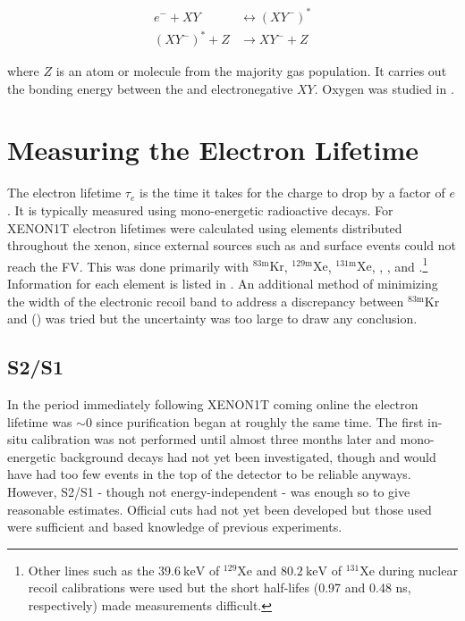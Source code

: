 \begin{enumerate}
\begin{subequations}
\begin{align}
e^- + XY &\leftrightarrow (XY^-)^* \\
(XY^-)^* + Z &\rightarrow XY^- + Z
\end{align}
\end{subequations}

\vspace{-5pt}

\noindent where $Z$ is an atom or molecule from the majority gas population.  It carries out the bonding energy between the
\electron and electronegative $XY$.  Oxygen was studied in .
\end{enumerate}



\section{Measuring the Electron Lifetime}
\label{sec:electron_lifetime_measurements}
The electron lifetime $\tau_e$ is the time it takes for the charge to drop by a factor of $e$.  It is typically measured using mono-energetic
radioactive decays.  For XENON1T electron lifetimes were calculated
using elements distributed throughout the xenon, since external \gammaray sources such as  and
surface events could not reach the FV.  This was done primarily with $\mathrm{^{83m}Kr}$, $\mathrm{^{129m}Xe}$, $\mathrm{^{131m}Xe}$,
, , and .\footnote{Other lines such as the $39.6\ \mathrm{keV}$ of $\mathrm{^{129}Xe}$ and
$80.2\ \mathrm{keV}$ of $\mathrm{^{131}Xe}$ during nuclear recoil calibrations were used but the short half-lifes (0.97 and 0.48 ns,
respectively) made measurements difficult.}  Information for each element is listed in .  An
additional method of minimizing the \stwob width of the  electronic recoil band to address a discrepancy between
$\mathrm{^{83m}Kr}$ and \alphadecays () was tried but the uncertainty was too large to
draw any conclusion.



\subsection{S2/S1}
\label{subsec:electron_lifetimes_measurement_ss}
In the period immediately following XENON1T coming online the electron lifetime was ${\sim} 0$ since purification began at roughly
the same time.  The first in-situ calibration was not performed until almost three months later and mono-energetic
background decays had not yet been investigated, though  and  would have had too few events in the top of the
detector to be reliable anyways.  However,
S2/S1 - though not energy-independent - was enough so to give reasonable estimates.  Official cuts had not yet been developed but
those used were sufficient and based knowledge of previous experiments.


